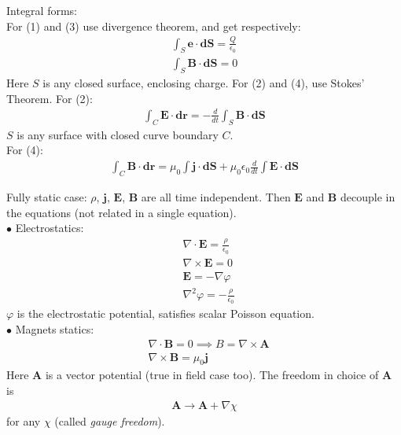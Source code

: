 \documentclass[a4paper]{article}
\begin{document}
Integral forms:\\
For (1) and (3) use divergence theorem, and get respectively:
\begin{equation*}
\begin{aligned}
\int_S \mathbf{e}\cdot \mathbf{dS} = \frac{Q}{\epsilon_0}\\
\int_S \mathbf{B}\cdot \mathbf{dS} = 0
\end{aligned}
\end{equation*}
Here $S$ is any closed surface, enclosing charge. For (2) and (4), use Stokes' Theorem. For (2):
\begin{equation*}
\begin{aligned}
\int_C \mathbf{E}\cdot \mathbf{dr} = -\frac{d}{dt}\int_S \mathbf{B}\cdot \mathbf{dS}
\end{aligned}
\end{equation*}
$S$ is any surface with closed curve boundary $C$.\\
For (4):
\begin{equation*}
\begin{aligned}
\int_C \mathbf{B}\cdot\mathbf{dr} = \mu_0 \int \mathbf{j}\cdot \mathbf{dS} + \mu_0 \epsilon_0 \frac{d}{dt}\int \mathbf{E}\cdot \mathbf{dS}
\end{aligned}
\end{equation*}

Fully static case: $\rho$, $\mathbf{j}$, $\mathbf{E}$, $\mathbf{B}$ are all time independent. Then $\mathbf{E}$ and $\mathbf{B}$ decouple in the equations (not related in a single equation).\\
$\bullet$ Electrostatics:
\begin{equation*}
\begin{aligned}
&\nabla\cdot\mathbf{E} = \frac{\rho}{\epsilon_0}\\
&\nabla\times\mathbf{E} = 0\\
&\mathbf{E} = -\nabla\varphi\\
&\nabla^2 \varphi = -\frac{\rho}{\epsilon_0}
\end{aligned}
\end{equation*}
$\varphi$ is the electrostatic potential, satisfies scalar Poisson equation.\\

$\bullet$ Magnets statics:
\begin{equation*}
\begin{aligned}
&\nabla\cdot \mathbf{B} = 0 \implies B = \nabla\times\mathbf{A}\\
&\nabla\times\mathbf{B} = \mu_0 \mathbf{j}
\end{aligned}
\end{equation*}
Here $\mathbf{A}$ is a vector potential (true in field case too). The freedom in choice of $\mathbf{A}$ is 
\begin{equation*}
\begin{aligned}
\mathbf{A} \to \mathbf{A} + \nabla \chi
\end{aligned}
\end{equation*}
for any $\chi$ (called \emph{gauge freedom}).\\
\end{document}

